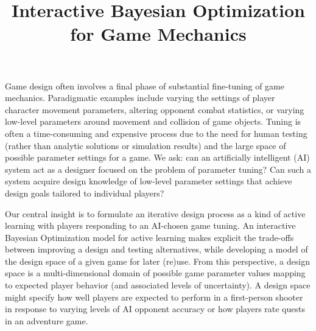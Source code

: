 \documentclass[letterpaper]{article}
\begin{document}
%
\title{Interactive Bayesian Optimization for Game Mechanics}
\author{
}



\maketitle
\begin{abstract}
\begin{quote}
\end{quote}
\end{abstract}

\noindent Game design often involves a final phase of substantial fine-tuning of game mechanics. Paradigmatic examples include varying the settings of player character movement parameters, altering opponent combat statistics, or varying low-level parameters around movement and collision of game objects. Tuning is often a time-consuming and expensive process due to the need for human testing (rather than analytic solutions or simulation results) and the large space of possible parameter settings for a game.
We ask: %
can an artificially intelligent (AI) system act as a designer focused on the problem of parameter tuning?
Can such a system acquire design knowledge of low-level parameter settings that achieve design goals tailored to individual players? 

Our central insight is to formulate an iterative design process as a kind of active learning with players responding to an AI-chosen game tuning. An interactive Bayesian Optimization model for active learning makes explicit the trade-offs between improving a design and testing alternatives, while developing a model of the design space of a given game for later (re)use.
From this perspective, a design space is a multi-dimensional domain of possible game parameter values mapping to expected player behavior (and associated levels of uncertainty). A design space might specify how well players are expected to perform in a first-person shooter in response to varying levels of AI opponent accuracy or how players rate quests in an adventure game. 
\end{document}
